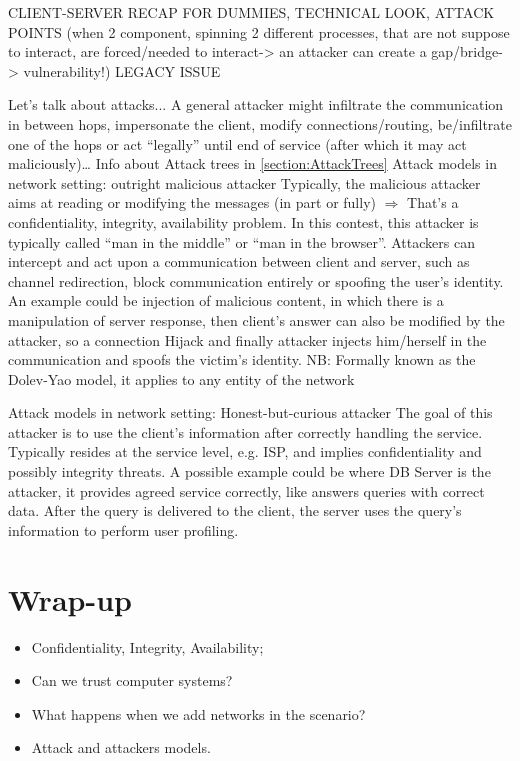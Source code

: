 CLIENT-SERVER RECAP FOR DUMMIES, TECHNICAL LOOK, ATTACK POINTS (when 2 component, spinning 2 different processes, that are not suppose to interact, are forced/needed to interact-> an attacker can create a gap/bridge-> vulnerability!) LEGACY ISSUE

Let's talk about attacks...
A general attacker might infiltrate the communication in between hops, impersonate the client, modify connections/routing, be/infiltrate one of the hops or act “legally” until end of service (after which it may act maliciously)\dots
Info about Attack trees in \ref{section:AttackTrees}
Attack models in network setting: outright malicious attacker
Typically, the malicious attacker aims at reading or modifying the messages (in part or fully) $\Rightarrow$ That’s a confidentiality, integrity, availability problem.
In this contest, this attacker is typically called “man in the middle” or “man in the browser”. Attackers can intercept and act upon a communication between client and server, such as channel redirection, block communication entirely or spoofing the user’s identity.
An example could be injection of malicious content, in which there is a manipulation of server response, then client’s answer can also be modified by the attacker, so a connection Hijack and finally attacker injects him/herself in the communication and spoofs the victim’s identity.
NB: Formally known as the Dolev-Yao model, it applies to any entity of the network

Attack models in network setting: Honest-but-curious attacker
The goal of this attacker is to use the client’s information after correctly handling the service. Typically resides at the service level, e.g. ISP,  and implies confidentiality and possibly integrity threats.
A possible example could be where DB Server is the attacker, it provides agreed service
correctly, like answers queries with correct data. After the query is delivered to the client, the server uses the query’s information to perform user profiling.

\section{Wrap-up}
\begin{itemize}
    \item Confidentiality, Integrity, Availability;
    \item Can we trust computer systems?
    \item What happens when we add networks in the scenario?
    \item Attack and attackers models.
\end{itemize}